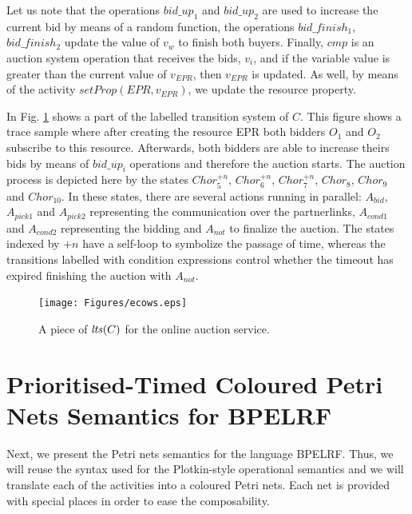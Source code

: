 \normalsize
\vspace{-1.0cm}

Let us note that the operations $bid\_up_{1}$ and $bid\_up_{2}$ are used to increase the current bid by means of a random function, the operations $bid\_finish_{1}$, $bid\_finish_{2}$ update the value of $v_w$ to finish both buyers. Finally, $cmp$ is an auction system operation that receives the bids, $v_i$, and if the variable value is greater than the current value of $v_{EPR}$, then $v_{EPR}$ is updated. As well, by means of the activity $setProp(EPR,v_{EPR})$, we update the resource property.

In Fig. \ref{auct} shows a part of the labelled transition system of $C$. This figure shows a trace sample where after creating the resource EPR both bidders $O_1$ and $O_2$ subscribe to this resource. Afterwards, both bidders are able to increase theirs bids by means of $bid\_up_i$ operations and therefore the auction starts. The auction process is depicted here by the states $Chor_{5}^{+n}$, $Chor_{6}^{+n}$, $Chor_{7}^{+n}$, $Chor_{8}$, $Chor_{9}$ and $Chor_{10}$. In these states, there are several actions running in parallel: $A_{bid}$, $A_{pick1}$ and $A_{pick2}$ representing the communication over the partnerlinks, $A_{cond1}$ and $A_{cond2}$ representing the bidding and $A_{not}$ to finalize the auction. The states indexed by $+n$ have a self-loop to symbolize the passage of time, whereas the transitions labelled with condition expressions control whether the timeout has expired finishing the auction with $A_{not}$.

\begin{figure}
\begin{center}
    \texttt{[image: Figures/ecows.eps]}
  \caption{A piece of ${\it lts}(C)$ for the online auction service.}
  \label{auct}
\end{center}
\end{figure}

\newpage

\section{Prioritised-Timed Coloured Petri Nets Semantics for BPELRF}\label{semantics}

Next, we present the Petri nets semantics for the language BPELRF. Thus, we will reuse the syntax used for the Plotkin-style operational semantics
and we will translate each of the activities into a coloured Petri nets. Each net is provided with special places in order to ease the composability.

